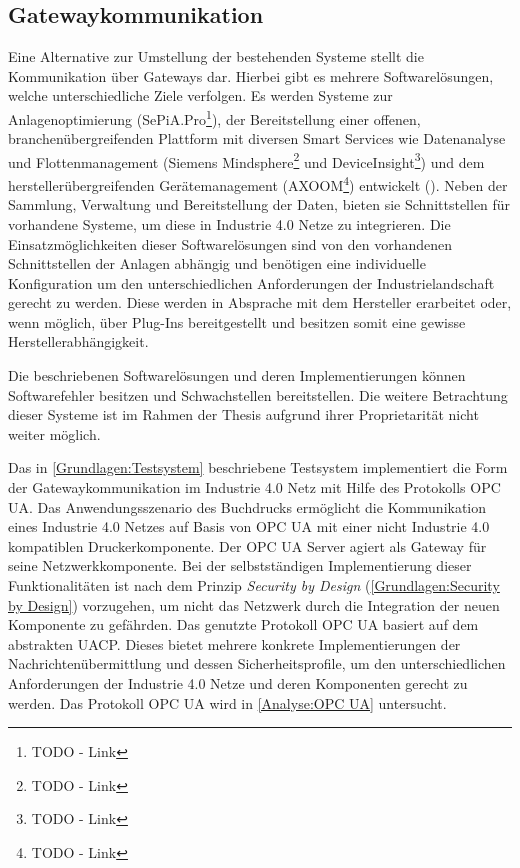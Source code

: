 \subsection{Gatewaykommunikation}
\label{Analyse:Gatewaykommunikation}
Eine Alternative zur Umstellung der bestehenden Systeme stellt die Kommunikation über Gateways dar. Hierbei gibt es mehrere Softwarelösungen, welche unterschiedliche Ziele verfolgen. Es werden Systeme zur Anlagenoptimierung (SePiA.Pro\footnote{TODO - Link}), der Bereitstellung einer offenen, branchenübergreifenden Plattform mit diversen Smart Services wie Datenanalyse und Flottenmanagement (Siemens Mindsphere\footnote{TODO - Link} und DeviceInsight\footnote{TODO - Link}) und dem herstellerübergreifenden Gerätemanagement (AXOOM\footnote{TODO - Link}) entwickelt (\cite{acatec2016}). Neben der Sammlung, Verwaltung und Bereitstellung der Daten, bieten sie Schnittstellen für vorhandene Systeme, um diese in Industrie 4.0 Netze zu integrieren. Die Einsatzmöglichkeiten dieser Softwarelösungen sind von den vorhandenen Schnittstellen der Anlagen abhängig und benötigen eine individuelle Konfiguration um den unterschiedlichen Anforderungen der Industrielandschaft gerecht zu werden. Diese werden in Absprache mit dem Hersteller erarbeitet oder, wenn möglich, über Plug-Ins bereitgestellt und besitzen somit eine gewisse Herstellerabhängigkeit.

Die beschriebenen Softwarelösungen und deren Implementierungen können Softwarefehler besitzen und Schwachstellen bereitstellen. Die weitere Betrachtung dieser Systeme ist im Rahmen der Thesis aufgrund ihrer Proprietarität nicht weiter möglich.

Das in \autoref{Grundlagen:Testsystem} beschriebene Testsystem implementiert die Form der Gatewaykommunikation im Industrie 4.0 Netz mit Hilfe des Protokolls \ac{OPC UA}. Das Anwendungsszenario des Buchdrucks ermöglicht die Kommunikation eines Industrie 4.0 Netzes auf Basis von \ac{OPC UA} mit einer nicht Industrie 4.0 kompatiblen Druckerkomponente. Der \ac{OPC UA} Server agiert als Gateway für seine Netzwerkkomponente. Bei der selbstständigen Implementierung dieser Funktionalitäten ist nach dem Prinzip \textit{Security by Design} (\autoref{Grundlagen:Security by Design}) vorzugehen, um nicht das Netzwerk durch die Integration der neuen Komponente zu gefährden. Das genutzte Protokoll \ac{OPC UA} basiert auf dem abstrakten \ac{UACP}. Dieses bietet mehrere konkrete Implementierungen der Nachrichtenübermittlung und dessen Sicherheitsprofile, um den unterschiedlichen Anforderungen der Industrie 4.0 Netze und deren Komponenten gerecht zu werden. Das Protokoll \ac{OPC UA} wird in \autoref{Analyse:OPC UA} untersucht.


